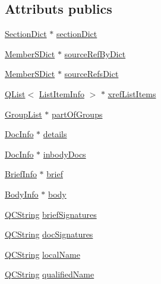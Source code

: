 \subsection*{Attributs publics}
\begin{DoxyCompactItemize}
\item 
\hyperlink{class_section_dict}{Section\+Dict} $\ast$ \hyperlink{class_definition_impl_a34e4463846d5f873f07509ae80e38724}{section\+Dict}
\item 
\hyperlink{class_member_s_dict}{Member\+S\+Dict} $\ast$ \hyperlink{class_definition_impl_a854eb82c0fc4b42d42892b42ce924e39}{source\+Ref\+By\+Dict}
\item 
\hyperlink{class_member_s_dict}{Member\+S\+Dict} $\ast$ \hyperlink{class_definition_impl_af37154064cce9133525a1b3badb4a11d}{source\+Refs\+Dict}
\item 
\hyperlink{class_q_list}{Q\+List}$<$ \hyperlink{struct_list_item_info}{List\+Item\+Info} $>$ $\ast$ \hyperlink{class_definition_impl_a17e3c2a8898eb19fd5c2f044876de607}{xref\+List\+Items}
\item 
\hyperlink{class_group_list}{Group\+List} $\ast$ \hyperlink{class_definition_impl_aab2bc75a96ff757092b3e6bc3f5ef9ac}{part\+Of\+Groups}
\item 
\hyperlink{struct_doc_info}{Doc\+Info} $\ast$ \hyperlink{class_definition_impl_ab2d8326c89339ab1a656626763053c97}{details}
\item 
\hyperlink{struct_doc_info}{Doc\+Info} $\ast$ \hyperlink{class_definition_impl_aa385084930d80331a6502c35ffacbe02}{inbody\+Docs}
\item 
\hyperlink{struct_brief_info}{Brief\+Info} $\ast$ \hyperlink{class_definition_impl_abf7d7378fb40c8bc74ca94dce41cb8cd}{brief}
\item 
\hyperlink{struct_body_info}{Body\+Info} $\ast$ \hyperlink{class_definition_impl_abf326140fdf738a7b427cb9a1f447e43}{body}
\item 
\hyperlink{class_q_c_string}{Q\+C\+String} \hyperlink{class_definition_impl_abb2e7301fb3f4fb9ca9d49825156a534}{brief\+Signatures}
\item 
\hyperlink{class_q_c_string}{Q\+C\+String} \hyperlink{class_definition_impl_a6c3f06715a0145760eaea8ee4a966abb}{doc\+Signatures}
\item 
\hyperlink{class_q_c_string}{Q\+C\+String} \hyperlink{class_definition_impl_a816cc358ff8b86218b801a95085dd347}{local\+Name}
\item 
\hyperlink{class_q_c_string}{Q\+C\+String} \hyperlink{class_definition_impl_a06ff1b32fcaa04543ff4a12b4a82e1d7}{qualified\+Name}

\end{DoxyCompactItemize}

